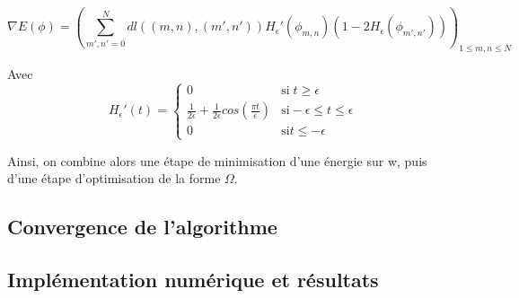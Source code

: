 \[ \nabla E (\phi) = ( \sum \limits_{m',n' = 0}^N dl((m,n),(m',n')) H_{\epsilon}' (\phi_{m,n}) ( 1 - 2H_{\epsilon}(\phi_{m',n'})) ) _{1 \leq m,n \leq N}  \] 

Avec 
\[ H_{\epsilon}' (t) = \left\{ \begin{matrix}
0 & \text{si} \; t \geq \epsilon \\
\frac{1}{2 \epsilon} + \frac{1}{2 \epsilon} cos(\frac{\pi t}{\epsilon}) & \text{si} -\epsilon \leq t \leq \epsilon \\
0 & \text{si} t \leq - \epsilon 
\end{matrix} \right. \] 


Ainsi, on combine alors une étape de minimisation d'une énergie sur w, puis d'une étape d'optimisation de la forme $\Omega$. 
\subsection{Convergence de l'algorithme}
\subsection{Implémentation numérique et résultats}
